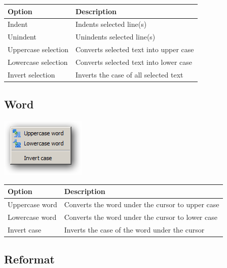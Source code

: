 \begin{scriptsize}\begin{tabularx}{\textwidth}{>{\hsize=0.4\hsize}X>{\hsize=0.6\hsize}X}\\
    \hline
    \textbf{Option} & \textbf{Description} \\
    \hline
    Indent & Indents selected line(s) \\
    Unindent & Unindents selected line(s) \\
    Uppercase selection & Converts selected text into upper case \\
    Lowercase selection & Converts selected text into lower case \\
    Invert selection & Inverts the case of all selected text \\
    \hline
  \end{tabularx}\end{scriptsize}


\hypertarget{menu_format_word}{}
\subsection{Word}

\includegraphics[scale=0.50]{./res/menu_format_word.png}\\

\begin{scriptsize}\begin{tabularx}{\textwidth}{>{\hsize=0.3\hsize}X>{\hsize=0.7\hsize}X}\\
    \hline
    \textbf{Option} & \textbf{Description} \\
    \hline
    Uppercase word & Converts the word under the cursor to upper case \\
    Lowercase word & Converts the word under the cursor to lower case \\
    Invert case & Inverts the case of the word under the cursor \\
    \hline
  \end{tabularx}\end{scriptsize}

\hypertarget{menu_format_reformat}{}
\subsection{Reformat}

